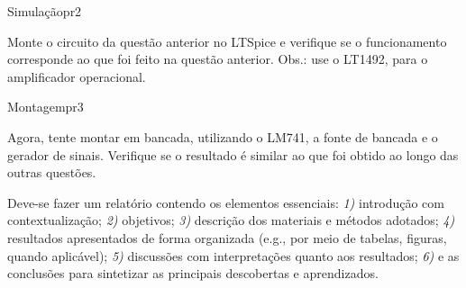 \begin{problem}{Simulação}{pr2}

Monte o circuito da questão anterior no LTSpice e verifique se o funcionamento corresponde ao que foi feito na questão anterior. Obs.: use o LT1492, para o amplificador operacional. \\

\end{problem}

\begin{problem}{Montagem}{pr3}

Agora, tente montar em bancada, utilizando o LM741, a fonte de bancada e o gerador de sinais. Verifique se o resultado é similar ao que foi obtido ao longo das outras questões. \\

\end{problem}

\begin{obs}

Deve-se fazer um relatório contendo os elementos essenciais: \textit{1)} introdução com contextualização; \textit{2)} objetivos; \textit{3)} descrição dos materiais e métodos adotados; \textit{4)} resultados apresentados de forma organizada (e.g., por meio de tabelas, figuras, quando aplicável); \textit{5)} discussões com interpretações quanto aos resultados; \textit{6)} e as conclusões para sintetizar as principais descobertas e aprendizados.

\end{obs}

\newpage

\printbibliography


